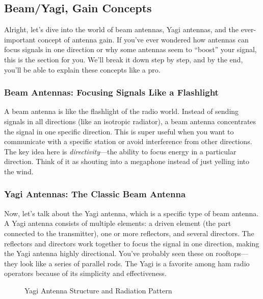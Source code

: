 \subsection{Beam/Yagi, Gain Concepts}
\label{subsec:beam-yagi}

Alright, let’s dive into the world of beam antennas, Yagi antennas, and the ever-important concept of antenna gain. If you’ve ever wondered how antennas can focus signals in one direction or why some antennas seem to “boost” your signal, this is the section for you. We’ll break it down step by step, and by the end, you’ll be able to explain these concepts like a pro.

\subsubsection*{Beam Antennas: Focusing Signals Like a Flashlight}
A beam antenna is like the flashlight of the radio world. Instead of sending signals in all directions (like an isotropic radiator), a beam antenna concentrates the signal in one specific direction. This is super useful when you want to communicate with a specific station or avoid interference from other directions. The key idea here is \textit{directivity}—the ability to focus energy in a particular direction. Think of it as shouting into a megaphone instead of just yelling into the wind.

\subsubsection*{Yagi Antennas: The Classic Beam Antenna}
Now, let’s talk about the Yagi antenna, which is a specific type of beam antenna. A Yagi antenna consists of multiple elements: a driven element (the part connected to the transmitter), one or more reflectors, and several directors. The reflectors and directors work together to focus the signal in one direction, making the Yagi antenna highly directional. You’ve probably seen these on rooftops—they look like a series of parallel rods. The Yagi is a favorite among ham radio operators because of its simplicity and effectiveness.

\begin{figure}[h]
    \centering
    \caption{Yagi Antenna Structure and Radiation Pattern}
    \label{fig:yagi-antenna}
\end{figure}

